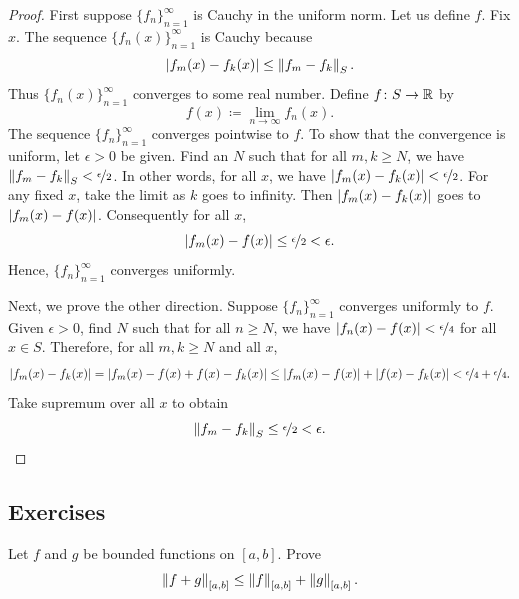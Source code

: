 \begin{proof}
First suppose $\{ f_n \}_{n=1}^\infty$ is Cauchy in the uniform norm.
Let us define $f$.  Fix $x$.
The sequence $\bigl\{ f_n(x) \bigr\}_{n=1}^\infty$ is Cauchy because
\begin{equation*}
\left\lvert {f_m(x)-f_k(x)} \right\rvert
\leq
\left\lVert {f_m-f_k} \right\rVert_S .
\end{equation*}
Thus $\bigl\{ f_n(x) \bigr\}_{n=1}^\infty$ converges to some real number.  Define $f \colon S
\to {\mathbb{R}}$ by
\begin{equation*}
f(x) \coloneqq \lim_{n \to \infty} f_n(x) .
\end{equation*}
The sequence
$\{ f_n \}_{n=1}^\infty$ converges pointwise to $f$.  To show that the convergence
is uniform, let $\epsilon > 0$ be given.  Find an $N$ such that
for all $m, k \geq N$, we have
$\left\lVert {f_m-f_k} \right\rVert_S < \nicefrac{\epsilon}{2}$.  In other words, for
all $x$, we have
$\left\lvert {f_m(x)-f_k(x)} \right\rvert < \nicefrac{\epsilon}{2}$.  For any fixed $x$, take the limit
as $k$ goes to infinity.  Then $\left\lvert {f_m(x)-f_k(x)} \right\rvert$
goes to $\left\lvert {f_m(x)-f(x)} \right\rvert$.
Consequently for all $x$,
\begin{equation*}
\left\lvert {f_m(x)-f(x)} \right\rvert \leq \nicefrac{\epsilon}{2} < \epsilon .
\end{equation*}
Hence, $\{ f_n \}_{n=1}^\infty$ converges uniformly.

Next, we prove the other direction.
Suppose $\{ f_n \}_{n=1}^\infty$ converges uniformly to
$f$.  Given $\epsilon > 0$, find $N$ such that for all $n \geq N$,
we have $\left\lvert {f_n(x)-f(x)} \right\rvert < \nicefrac{\epsilon}{4}$ for all $x \in S$.
Therefore, for all $m, k \geq N$ and all $x$,
\begin{equation*}
\left\lvert {f_m(x)-f_k(x)} \right\rvert = 
\left\lvert {f_m(x)-f(x)+f(x)-f_k(x)} \right\rvert \leq
\left\lvert {f_m(x)-f(x)} \right\rvert+\left\lvert {f(x)-f_k(x)} \right\rvert < \nicefrac{\epsilon}{4} +
\nicefrac{\epsilon}{4} .
\end{equation*}
Take supremum over all $x$ to obtain
\begin{equation*}
\left\lVert {f_m-f_k} \right\rVert_S \leq \nicefrac{\epsilon}{2} < \epsilon .  \qedhere
\end{equation*}
\end{proof}

\subsection{Exercises}

\begin{exercise}
Let $f$ and $g$ be bounded functions on $[a,b]$.  Prove 
\begin{equation*}
\left\lVert {f+g} \right\rVert_{[a,b]} \leq \left\lVert {f} \right\rVert_{[a,b]} + \left\lVert {g} \right\rVert_{[a,b]} .
\end{equation*}
\end{exercise}

